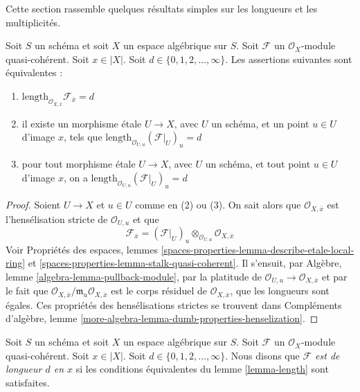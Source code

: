 \noindent
Cette section rassemble quelques résultats simples sur les longueurs et les
multiplicités.

\begin{lemma}
\label{lemma-length}
Soit $S$ un schéma et soit $X$ un espace algébrique sur $S$. Soit $\mathcal{F}$
un $\mathcal{O}_X$-module quasi-cohérent. Soit $x \in |X|$. Soit $d \in
\{0, 1, 2, \ldots, \infty\}$. Les assertions suivantes sont équivalentes :
\begin{enumerate}
\item
$\text{length}_{\mathcal{O}_{X, \overline{x}}} \mathcal{F}_{\overline{x}} = d$
\item il existe un morphisme \'etale $U \to X$, avec $U$ un schéma, et un
point $u \in U$ d'image $x$, tels que $\text{length}_{\mathcal{O}_{U, u}}
(\mathcal{F}|_U)_u = d$
\item pour tout morphisme \'etale $U \to X$, avec $U$ un schéma, et tout
point $u \in U$ d'image $x$, on a $\text{length}_{\mathcal{O}_{U, u}}
(\mathcal{F}|_U)_u = d$
\end{enumerate}
\end{lemma}

\begin{proof}
Soient $U \to X$ et $u \in U$ comme en (2) ou (3). On sait alors que
$\mathcal{O}_{X, \overline{x}}$ est l'hensélisation stricte de
$\mathcal{O}_{U, u}$ et que
$$
\mathcal{F}_{\overline{x}} =
(\mathcal{F}|_U)_u \otimes_{\mathcal{O}_{U, u}} \mathcal{O}_{X, \overline{x}}
$$
Voir Propriétés des espaces, lemmes
\ref{spaces-properties-lemma-describe-etale-local-ring} et
\ref{spaces-properties-lemma-stalk-quasi-coherent}. Il s'ensuit, par Algèbre,
lemme \ref{algebra-lemma-pullback-module}, par la platitude de
$\mathcal{O}_{U, u} \to \mathcal{O}_{X, \overline{x}}$ et par le fait que
$\mathcal{O}_{X, \overline{x}}/\mathfrak m_u\mathcal{O}_{X,
\overline{x}}$ est le corps résiduel de $\mathcal{O}_{X, \overline{x}}$, que
les longueurs sont égales. Ces propriétés des hensélisations strictes se
trouvent dans Compléments d'algèbre, lemme
\ref{more-algebra-lemma-dumb-properties-henselization}.
\end{proof}

\begin{definition}
\label{definition-length-at-x}
Soit $S$ un schéma et soit $X$ un espace algébrique sur $S$. Soit $\mathcal{F}$
un $\mathcal{O}_X$-module quasi-cohérent. Soit $x \in |X|$. Soit $d \in
\{0, 1, 2, \ldots, \infty\}$. Nous disons que {\it $\mathcal{F}$ est de longueur
$d$ en $x$} si les conditions équivalentes du lemme \ref{lemma-length} sont
satisfaites.
\end{definition}

